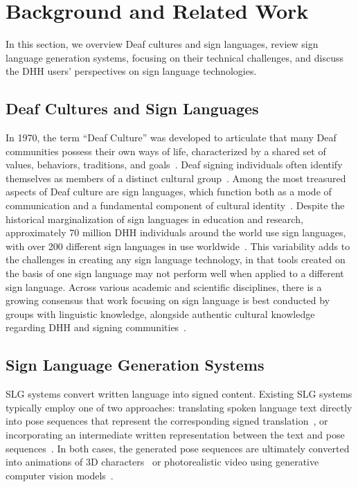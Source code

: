 \section{Background and Related Work}\label{sec:rw}

In this section, we overview Deaf cultures and sign languages, review sign language generation systems, focusing on their technical challenges, and discuss the DHH users' perspectives on sign language technologies. 

\subsection{Deaf Cultures and Sign Languages}\label{subsec:rw_deaf_culture_asl}

In 1970, the term ``Deaf Culture'' was developed to articulate that many Deaf communities possess their own ways of life, characterized by a shared set of values, behaviors, traditions, and goals~\cite{bragg2021fate,ladd2003understanding}. Deaf signing individuals often identify themselves as members of a distinct cultural group~\cite{obasi2008seeing,padden1988deaf}. Among the most treasured aspects of Deaf culture are sign languages, which function both as a mode of communication and a fundamental component of cultural identity~\cite{glickman1993deaf,bragg_sign_2019,bda}. Despite the historical marginalization of sign languages in education and research, approximately 70 million DHH individuals around the world use sign languages, with over 200 different sign languages in use worldwide~\cite{wfd,huenerfauth2009sign,bragg2021fate}. This variability adds to the challenges in creating any sign language technology, in that tools created on the basis of one sign language may not perform well when applied to a different sign language. Across various academic and scientific disciplines, there is a growing consensus that work focusing on sign language is best conducted by groups with linguistic knowledge, alongside authentic cultural knowledge regarding DHH and signing communities~\cite{desai2024systemic,bragg2021fate}.

\subsection{Sign Language Generation Systems}
\label{subsec:rw_SLG}

SLG systems convert written language into signed content. Existing SLG systems typically employ one of two approaches: translating spoken language text directly into pose sequences that represent the corresponding signed translation~\cite{hwang2024universal,hwang2024gloss}, or incorporating an intermediate written representation between the text and pose sequences~\cite{stoll_text2sign_2020, saunders_progressive_2020, moryossef2023open, walsh_sign_2024, xie2024g2p, saunders2020adversarial, arkushin2023ham2pose}. In both cases, the generated pose sequences are ultimately converted into animations of 3D characters~\cite{kim2022sign,kipp2011sign} or photorealistic video using generative computer vision models~\cite{saunders_signing_2022,stoll_text2sign_2020,saunders2020everybody}. 

